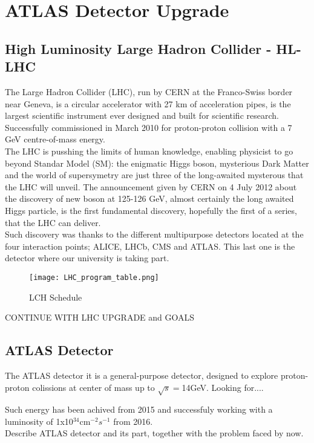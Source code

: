 \section{ATLAS Detector Upgrade}

\subsection{High Luminosity Large Hadron Collider - HL-LHC}
The Large Hadron Collider (LHC), run by CERN at the Franco-Swiss border near Geneva, is a circular accelerator with 27 km of acceleration pipes, is the largest scientific instrument ever designed and built for scientific research. Successfully commissioned in March 2010 for proton-proton collision with a 7 GeV centre-of-mass energy.\\
The LHC is pusshing the limits of human knowledge, enabling physicist to go beyond Standar Model (SM): the enigmatic Higgs boson, mysterious Dark Matter and the world of supersymetry are just three of the long-awaited mysterous that the LHC will unveil. The announcement given by CERN on 4 July 2012 about the discovery of new boson at 125-126 GeV, almost certainly the long awaited Higgs particle, is the first fundamental discovery, hopefully the first of a series, that the LHC can deliver.\\
Such discovery was thanks to the different multipurpose detectors located at the four interaction points; ALICE, LHCb, CMS and ATLAS. This last one is the detector where our university is taking part.\\
\begin{figure}[ht]
		\centering
		\texttt{[image: LHC\_program\_table.png]}
		\caption{LCH Schedule}\label{fig:a}
\end{figure}
\par
CONTINUE WITH LHC UPGRADE and GOALS

\subsection{ATLAS Detector}
The ATLAS detector it is a general-purpose detector, designed to explore proton-proton colissions at center of mass up to $\sqrt{s}=$14GeV. Looking for.... \par
Such energy has been achived from 2015 and successfuly working with a luminosity of 1x10$^{34}$cm$^{-2}s^{-1}$ from 2016.\\

Describe ATLAS detector and its part, together with the problem faced by now.\par


